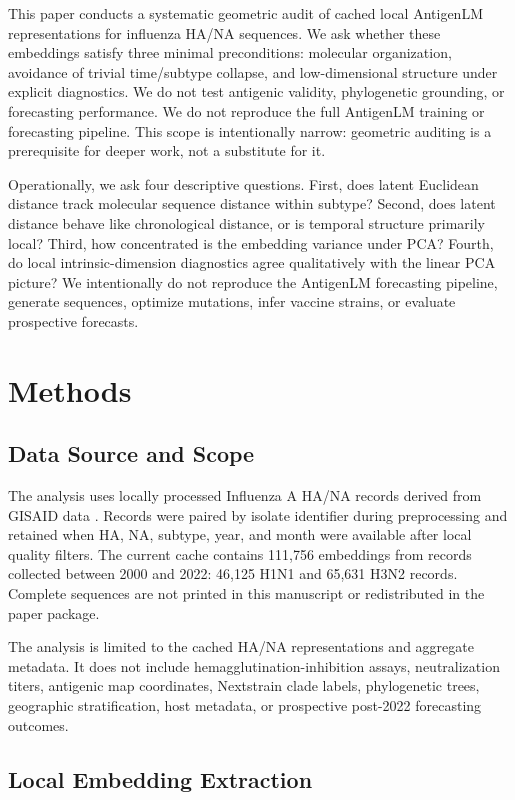 \documentclass[11pt]{article}
\begin{document}
This paper conducts a systematic geometric audit of cached local AntigenLM representations for influenza HA/NA sequences. We ask whether these embeddings satisfy three minimal preconditions: molecular organization, avoidance of trivial time/subtype collapse, and low-dimensional structure under explicit diagnostics. We do not test antigenic validity, phylogenetic grounding, or forecasting performance. We do not reproduce the full AntigenLM training or forecasting pipeline. This scope is intentionally narrow: geometric auditing is a prerequisite for deeper work, not a substitute for it.

Operationally, we ask four descriptive questions. First, does latent Euclidean distance track molecular sequence distance within subtype? Second, does latent distance behave like chronological distance, or is temporal structure primarily local? Third, how concentrated is the embedding variance under PCA? Fourth, do local intrinsic-dimension diagnostics agree qualitatively with the linear PCA picture? We intentionally do not reproduce the AntigenLM forecasting pipeline, generate sequences, optimize mutations, infer vaccine strains, or evaluate prospective forecasts.

\section{Methods}

\subsection{Data Source and Scope}

The analysis uses locally processed Influenza A HA/NA records derived from GISAID data \cite{shu2017gisaid}. Records were paired by isolate identifier during preprocessing and retained when HA, NA, subtype, year, and month were available after local quality filters. The current cache contains 111,756 embeddings from records collected between 2000 and 2022: 46,125 H1N1 and 65,631 H3N2 records. Complete sequences are not printed in this manuscript or redistributed in the paper package.

The analysis is limited to the cached HA/NA representations and aggregate metadata. It does not include hemagglutination-inhibition assays, neutralization titers, antigenic map coordinates, Nextstrain clade labels, phylogenetic trees, geographic stratification, host metadata, or prospective post-2022 forecasting outcomes.

\subsection{Local Embedding Extraction}
\end{document}
